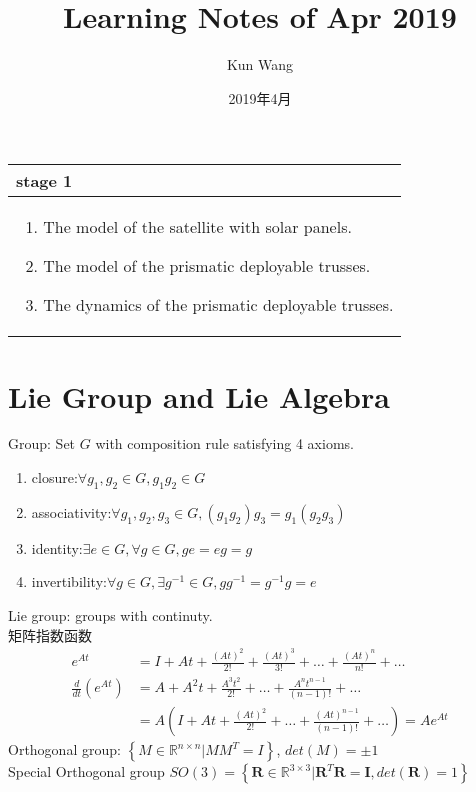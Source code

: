 \documentclass[12pt]{article}
\title{Learning Notes of Apr 2019}
\author{Kun Wang}
\date{2019年4月}
\begin{document}
        \maketitle

        \begin{center}
            \begin{tabular}{|m{16cm}|}
                \hline
                stage 1\\
                \hline
                \begin{enumerate}
                    \item The model of the satellite with solar panels.
                    \item The model of the prismatic deployable trusses.
                    \item The dynamics of the prismatic deployable trusses.
                \end{enumerate}\\
                \hline
            \end{tabular}
        \end{center}

        \section{Lie Group and Lie Algebra}
        Group: Set $G$ with composition rule satisfying 4 axioms.
        \begin{enumerate}
           \item closure:$\forall g_1,g_2\in G,g_1g_2\in G$
           \item associativity:$\forall g_1,g_2,g_3\in G,(g_1g_2)g_3=g_1(g_2g_3)$
           \item identity:$\exists e\in G,\forall g\in G, ge=eg=g$
           \item invertibility:$\forall g\in G,\exists g^{-1}\in G, gg^{-1}=g^{-1}g=e$
        \end{enumerate}
        Lie group: groups with continuty.\\ 
        \indent 矩阵指数函数
        \begin{equation*}
            \begin{aligned}
                e^{At}&=I+At+\frac{(At)^2}{2!}+\frac{(At)^3}{3!}+\dots+\frac{(At)^n}{n!}+\dots\\
                \frac{d}{dt}(e^{At})&=A+A^2t+\frac{A^3t^2}{2!}+\dots+\frac{A^nt^{n-1}}{(n-1)!}+\dots\\
                &=A(I+At+\frac{(At)^2}{2!}+\dots+\frac{(At)^{n-1}}{(n-1)!}+\dots)=Ae^{At}
            \end{aligned}
        \end{equation*}
        \indent Orthogonal group: $\left\{M\in \mathbb{R}^{n\times n}|MM^T=I\right\}$, $det(M)=\pm 1$\\
        \indent Special Orthogonal group
        $SO(3)=\left\{\mathbf{R}\in\mathbb{R}^{3 \times 3}|
        \mathbf{R}^T\mathbf{R}=\mathbf{I},det(\mathbf{R})=1\right\}$
        
\end{document}
